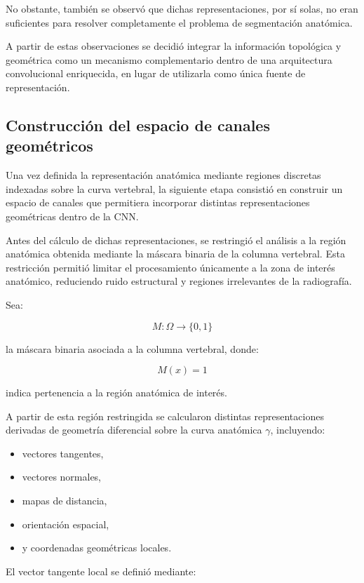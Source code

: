 \documentclass[conference]{IEEEtran}
\begin{document}
No obstante, también se observó que dichas representaciones, por sí solas, no eran suficientes para resolver completamente el problema de segmentación anatómica.

A partir de estas observaciones se decidió integrar la información topológica y geométrica como un mecanismo complementario dentro de una arquitectura convolucional enriquecida, en lugar de utilizarla como única fuente de representación.



\subsection{Construcción del espacio de canales geométricos}

Una vez definida la representación anatómica mediante regiones discretas indexadas sobre la curva vertebral, la siguiente etapa consistió en construir un espacio de canales que permitiera incorporar distintas representaciones geométricas dentro de la CNN.

Antes del cálculo de dichas representaciones, se restringió el análisis a la región anatómica obtenida mediante la máscara binaria de la columna vertebral. Esta restricción permitió limitar el procesamiento únicamente a la zona de interés anatómico, reduciendo ruido estructural y regiones irrelevantes de la radiografía.

Sea:

\[
M:\Omega \rightarrow \{0,1\}
\]

la máscara binaria asociada a la columna vertebral, donde:

\[
M(x)=1
\]

indica pertenencia a la región anatómica de interés.

A partir de esta región restringida se calcularon distintas representaciones derivadas de geometría diferencial sobre la curva anatómica $\gamma$, incluyendo:

\begin{itemize}
    \item vectores tangentes,
    \item vectores normales,
    \item mapas de distancia,
    \item orientación espacial,
    \item y coordenadas geométricas locales.
\end{itemize}

El vector tangente local se definió mediante:
\end{document}
